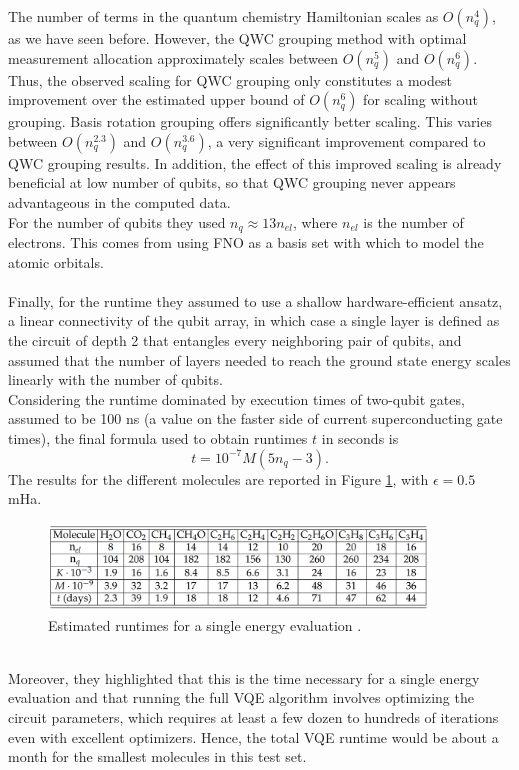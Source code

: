 The number of terms in the quantum chemistry Hamiltonian scales as $O(n_q^4)$, as we have seen before. However, the QWC grouping method with optimal measurement allocation approximately scales between $O(n_q^5)$ and $O(n_q^6)$. Thus, the observed scaling for QWC grouping only constitutes a modest improvement over the estimated upper bound of $O(n_q^6)$ for scaling without grouping.
Basis rotation grouping offers significantly better scaling. This varies between $O(n_q^{2.3})$ and $O(n_q^{3.6})$, a very significant improvement compared to QWC grouping results. In addition, the effect of this improved scaling is already beneficial at low number of qubits, so that QWC grouping never appears advantageous in the computed data. \\
For the number of qubits they used $n_q \approx 13 n_{el}$, where $n_{el}$ is the number of electrons. This comes from using FNO as a basis set with which to model the atomic orbitals. \\
\\
Finally, for the runtime they assumed to use a shallow hardware-efficient ansatz, a linear connectivity of the qubit array, in which case a single layer is defined as the circuit of depth 2 that entangles every neighboring pair of qubits, and assumed that the number of layers needed to reach the ground state energy scales linearly with the number of qubits. \\
Considering the runtime dominated by execution times of two-qubit gates, assumed to be 100 ns (a value on the faster side of current superconducting gate times), the final formula used to obtain runtimes $t$ in seconds is
\begin{equation}
    t = 10^{-7} M (5n_q - 3).
\end{equation}
The results for the different molecules are reported in Figure \ref{VQE scaling 1}, with $\epsilon = 0.5$ mHa.
\begin{figure}[ht]
  \centering
  \includegraphics[width=0.9\textwidth]{figures/VQE scaling 1.png}
  \caption{Estimated runtimes for a single energy evaluation \cite{Gonthier2020Dec}.} \label{VQE scaling 1}
\end{figure} \\
Moreover, they highlighted that this is the time necessary for a single energy evaluation and that running the full VQE algorithm involves optimizing the circuit parameters, which requires at least a few dozen to hundreds of iterations even with excellent optimizers. Hence, the total VQE runtime would be about a month for the smallest molecules in this test set.